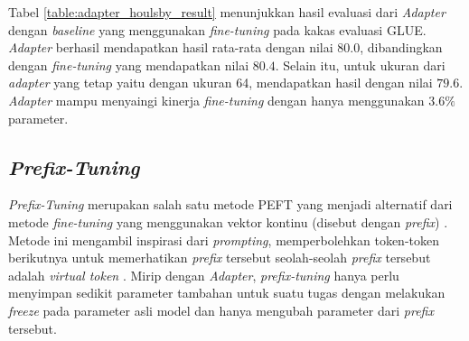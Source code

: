 \begin{table}[h]
    \vspace{0.25cm}
    \centering
    \caption{Hasil evaluasi \textit{Adapter} konfigurasi \citeauthor{adapter_houlsby} pada GLUE \parencite{adapter_houlsby}}
    \label{table:adapter_houlsby_result}
\end{table}

Tabel \ref{table:adapter_houlsby_result} menunjukkan hasil evaluasi dari \textit{Adapter} dengan \textit{baseline} yang menggunakan \textit{fine-tuning} pada kakas evaluasi GLUE. \textit{Adapter} berhasil mendapatkan hasil rata-rata dengan nilai $80.0$, dibandingkan dengan \textit{fine-tuning} yang mendapatkan nilai $80.4$. Selain itu, untuk ukuran dari \textit{adapter} yang tetap yaitu dengan ukuran 64, mendapatkan hasil dengan nilai $79.6$. \textit{Adapter} mampu menyaingi kinerja \textit{fine-tuning} dengan hanya menggunakan $3.6\%$ parameter.

\subsection{\textit{Prefix-Tuning}}

\textit{Prefix-Tuning} merupakan salah satu metode PEFT yang menjadi alternatif dari metode \textit{fine-tuning} yang menggunakan vektor kontinu (disebut dengan \textit{prefix}) \parencite{prefix_tuning}. Metode ini mengambil inspirasi dari \textit{prompting}, memperbolehkan token-token berikutnya untuk memerhatikan \textit{prefix} tersebut seolah-seolah \textit{prefix} tersebut adalah \textit{virtual token} \parencite{prefix_tuning}. Mirip dengan \textit{Adapter}, \textit{prefix-tuning} hanya perlu menyimpan sedikit parameter tambahan untuk suatu tugas dengan melakukan \textit{freeze} pada parameter asli model dan hanya mengubah parameter dari \textit{prefix} tersebut.

